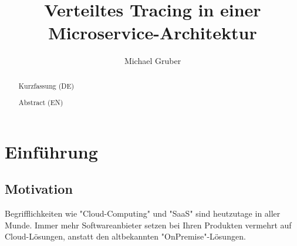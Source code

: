 \documentclass[a4paper,12p]{article}
\title{Verteiltes Tracing in einer Microservice-Architektur}
\author{Michael Gruber}
\date{}
\begin{document}
\maketitle









\begin{abstract}
Kurzfassung (DE)


\end{abstract}

\begin{abstract}
    Abstract (EN)
\end{abstract}


\section{Einführung}
\label{sec:einführung}

\subsection{Motivation}
\label{sec:motivation}

Begrifflichkeiten wie "Cloud-Computing" und "SaaS" sind heutzutage in aller Munde. Immer mehr Softwareanbieter setzen bei Ihren Produkten vermehrt auf Cloud-Lösungen, anstatt den altbekannten "OnPremise"-Lösungen.
\end{document}
